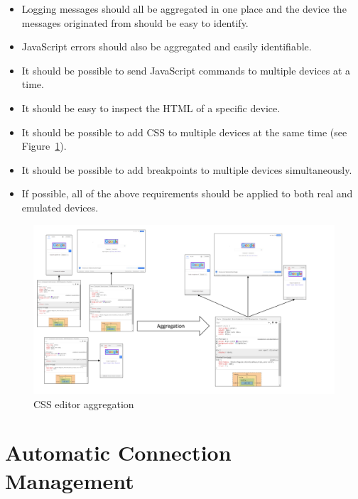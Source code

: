 \begin{itemize}
	\item Logging messages should all be aggregated in one place and the device the messages originated from should be easy to identify.
	\item JavaScript errors should also be aggregated and easily identifiable.
	\item It should be possible to send JavaScript commands to multiple devices at a time. 
	\item It should be easy to inspect the HTML of a specific device.
	\item It should be possible to add CSS to multiple devices at the same time (see Figure~\ref{fig:css_aggregation}).
	\item It should be possible to add breakpoints to multiple devices simultaneously.
	\item If possible, all of the above requirements should be applied to both real and emulated devices.
\end{itemize}

\begin{figure}[H]
  \centering
    \includegraphics[width=1.0\textwidth]{images/css_aggregation.pdf}
	\caption[CSS editor aggregation]{CSS editor aggregation}
	\label{fig:css_aggregation}
\end{figure}

\section{Automatic Connection Management}

